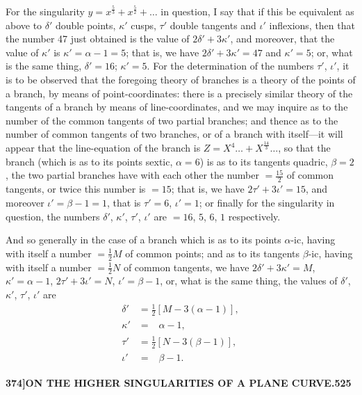 \documentclass[11pt,a4paper]{article}
\begin{document}
For the singularity $y = x^{\frac{5}{3}} + x^{\frac{5}{2}} + \ldots$ in question, I say that if this be equivalent as above to $\delta'$ double points, $\kappa'$ cusps, $\tau'$ double tangents and $\iota'$ inflexions, then that the number 47 just obtained is the value of $2\delta' + 3\kappa'$, and moreover, that the value of $\kappa'$ is $\kappa' = \alpha - 1 = 5$; that is, we have $2\delta' + 3\kappa' = 47$ and $\kappa' = 5$; or, what is the same thing, $\delta' = 16$; $\kappa' = 5$. For the determination of the numbers $\tau'$, $\iota'$, it is to be observed that the foregoing theory of branches is a theory of the points of a branch, by means of point-coordinates: there is a precisely similar theory of the tangents of a branch by means of line-coordinates, and we may inquire as to the number of the common tangents of two partial branches; and thence as to the number of common tangents of two branches, or of a branch with itself---it will appear that the line-equation of the branch is $Z = X^{4}\ldots + X^{\frac{14}{3}}\ldots$, so that the branch (which is as to its points sextic, $\alpha = 6$) is as to its tangents quadric, $\beta = 2$, the two partial branches have with each other the number $= \tfrac{15}{2}$ of common tangents, or twice this number is $= 15$; that is, we have $2\tau' + 3\iota' = 15$, and moreover $\iota' = \beta - 1 = 1$, that is $\tau' = 6$, $\iota' = 1$; or finally for the singularity in question, the numbers $\delta'$, $\kappa'$, $\tau'$, $\iota'$ are $= 16$, $5$, $6$, $1$ respectively.

And so generally in the case of a branch which is as to its points $\alpha$-ic, having with itself a number $= \tfrac{1}{2}M$ of common points; and as to its tangents $\beta$-ic, having with itself a number $= \tfrac{1}{2}N$ of common tangents, we have $2\delta' + 3\kappa' = M$, $\kappa' = \alpha - 1$, $2\tau' + 3\iota' = N$, $\iota' = \beta - 1$, or, what is the same thing, the values of $\delta'$, $\kappa'$, $\tau'$, $\iota'$ are
\begin{align*}
\delta' &= \tfrac{1}{2}[M - 3(\alpha - 1)],\\
\kappa' &= \phantom{\tfrac{1}{2}[}\alpha - 1,\\
\tau' &= \tfrac{1}{2}[N - 3(\beta - 1)],\\
\iota' &= \phantom{\tfrac{1}{2}[}\beta - 1.
\end{align*}

\newpage
\begin{flushright}
\textbf{374]\hspace{1em}ON THE HIGHER SINGULARITIES OF A PLANE CURVE.\hfill525}
\end{flushright}
\end{document}

